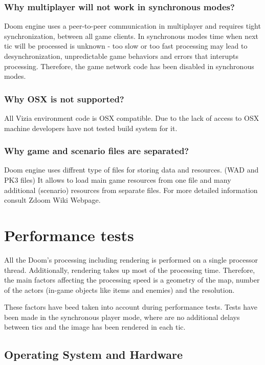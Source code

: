 \subsubsection{Why multiplayer will not work in synchronous modes?}

Doom engine uses a peer-to-peer communication in multiplayer and requires tight synchronization, between all game clients.
In synchronous modes time when next tic will be processed is unknown - too slow or too fast processing may lead to desynchronization, unpredictable game behaviors and errors that interupts processing. Therefore, the game network code has been disabled in synchronous modes.

\subsubsection{Why OSX is not supported?}

All Vizia environment code is OSX compatible. Due to the lack of access to OSX machine developers have not tested build system for it.

\subsubsection{Why game and scenario files are separated?}

Doom engine uses diffrent type of files for storing data and resources. (WAD and PK3 files) It allows to load main game resources from one file and many additional (scenario) resources from separate files. For more detailed information consult Zdoom Wiki Webpage\cite{zdoom-wiki}.

\section{Performance tests}\label{sec:performance}

All the Doom's processing including rendering is performed on a single processor thread. Additionally, rendering takes up most of the processing time. Therefore, the main factors affecting the processing speed is a geometry of the map, number of the actors (in-game objects like items and enemies) and the resolution. 

These factors have beed taken into account during performance tests. Tests have been made in the synchronous player mode, where are no additional delays between tics and the image has been rendered in each tic.

	\subsection{Operating System and Hardware}
	
